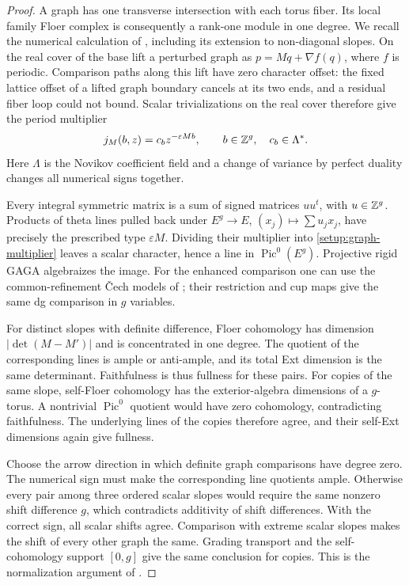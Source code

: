 \begin{proof}
A graph has one transverse intersection with each torus fiber.  Its
local family Floer complex is consequently a rank-one module in one
degree.  We recall the numerical calculation of
\cite[Lemma~9.1]{A8}, including its extension to non-diagonal slopes.
On the real cover of the base lift a perturbed graph as
$p=Mq+\nabla f(q)$, where $f$ is periodic.  Comparison paths along this
lift have zero character offset: the fixed lattice offset of a lifted
graph boundary cancels at its two ends, and a residual fiber loop could
not bound.  Scalar trivializations on the real cover therefore give
the period multiplier
\begin{equation}
 j_M(b,z)=c_bz^{-\varepsilon Mb},\qquad
 b\in\mathbb Z^g,\quad c_b\in\Lambda^*.
 \label{setup:graph-multiplier}
\end{equation}
Here $\Lambda$ is the Novikov coefficient field and a change of variance
by perfect duality changes all numerical signs together.

Every integral symmetric matrix is a sum of signed matrices $uu^t$,
with $u\in\mathbb Z^g$.  Products of theta lines pulled back under
$E^g\to E$, $(x_j)\mapsto\sum u_jx_j$, have precisely the prescribed
type $\varepsilon M$.  Dividing their multiplier into
\eqref{setup:graph-multiplier} leaves a scalar character, hence a line
in $\operatorname{Pic}^0(E^g)$.  Projective rigid GAGA algebraizes the
image.  For the enhanced comparison one can use the common-refinement
\v Cech models of \cite[Section~9]{A8}; their restriction and cup maps
give the same dg comparison in $g$ variables.

For distinct slopes with definite difference, Floer cohomology has
dimension $|\det(M-M')|$ and is concentrated in one degree.  The quotient
of the corresponding lines is ample or anti-ample, and its total Ext
dimension is the same determinant.  Faithfulness is thus fullness for
these pairs.  For copies of the same slope, self-Floer cohomology has
the exterior-algebra dimensions of a $g$-torus.  A nontrivial
$\operatorname{Pic}^0$ quotient would have zero cohomology, contradicting
faithfulness.  The underlying lines of the copies therefore agree, and
their self-Ext dimensions again give fullness.

Choose the arrow direction in which definite graph comparisons have
degree zero.  The numerical sign must make the corresponding line
quotients ample.  Otherwise every pair among three ordered scalar
slopes would require the same nonzero shift difference $g$, which
contradicts additivity of shift differences.  With the correct sign,
all scalar shifts agree.  Comparison with extreme scalar slopes makes
the shift of every other graph the same.  Grading transport and the
self-cohomology support $[0,g]$ give the same conclusion for copies.
This is the normalization argument of \cite[Lemma~9.2]{A8}.
\end{proof}

